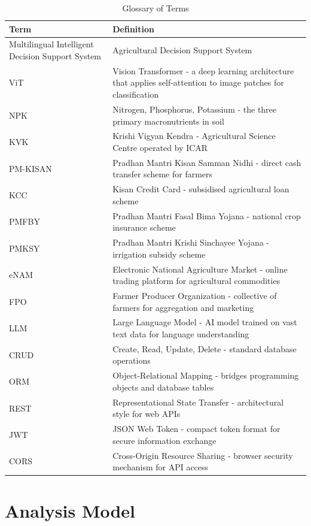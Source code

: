 \documentclass[12pt,a4paper]{article}
\newcommand{\tablefont}{\fontsize{10}{12}\selectfont}
\begin{document}
\begin{table}[H]
\centering
\tablefont
\begin{tabular}{|p{4cm}|p{8.5cm}|}
\hline
\textbf{Term} & \textbf{Definition} \\
\hline
Multilingual Intelligent Decision Support System & Agricultural Decision Support System \\
ViT & Vision Transformer - a deep learning architecture that applies self-attention to image patches for classification \\
NPK & Nitrogen, Phosphorus, Potassium - the three primary macronutrients in soil \\
KVK & Krishi Vigyan Kendra - Agricultural Science Centre operated by ICAR \\
PM-KISAN & Pradhan Mantri Kisan Samman Nidhi - direct cash transfer scheme for farmers \\
KCC & Kisan Credit Card - subsidised agricultural loan scheme \\
PMFBY & Pradhan Mantri Fasal Bima Yojana - national crop insurance scheme \\
PMKSY & Pradhan Mantri Krishi Sinchayee Yojana - irrigation subsidy scheme \\
eNAM & Electronic National Agriculture Market - online trading platform for agricultural commodities \\
FPO & Farmer Producer Organization - collective of farmers for aggregation and marketing \\
LLM & Large Language Model - AI model trained on vast text data for language understanding \\
CRUD & Create, Read, Update, Delete - standard database operations \\
ORM & Object-Relational Mapping - bridges programming objects and database tables \\
REST & Representational State Transfer - architectural style for web APIs \\
JWT & JSON Web Token - compact token format for secure information exchange \\
CORS & Cross-Origin Resource Sharing - browser security mechanism for API access \\
\hline
\end{tabular}
\caption{Glossary of Terms}
\end{table}

\section{Analysis Model}
\end{document}
